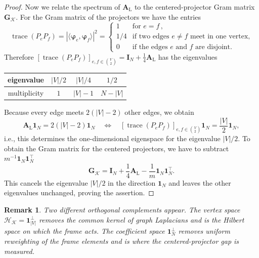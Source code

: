 \documentclass[a4paper]{amsart}
\numberwithin{equation}{section}
\newtheorem{remark}[theorem]{Remark}
\DeclareMathOperator{\trace}{trace}
\begin{document}
\begin{proof}
    Now we relate the spectrum of $\bm A_{\mathrm L}$ to the centered-projector Gram matrix $\bm G_{\mathcal K}$.
    For the Gram matrix of the projectors we have the entries
    \begin{equation*}
        \trace(P_eP_f)
        = |\langle\bm\varphi_e,\bm\varphi_f\rangle|^2
        = \begin{cases} 1 & \text{for }e=f \,, \\ 1/4 & \text{if two edges } e\neq f \text{ meet in one vertex,}\\ 0 & \text{if the edges } e\text{ and } f \text{ are disjoint.}\end{cases}
    \end{equation*}
    Therefore $[\trace(P_eP_f)]_{e,f\in\binom{V}{2}} = \bm I_{N} + \frac 14 \bm A_{\mathrm L}$ has the eigenvalues
    \begin{center}
    \begin{tabular}{c|ccc}
        eigenvalue & $|V|/2$ & $|V|/4$ & $1/2$ \\
        \hline
        multiplicity & $1$ & $|V|-1$ & $N-|V|$
    \end{tabular}
    \end{center}
    Because every edge meets $2(|V|-2)$ other edges, we obtain
    \begin{equation*}
        \bm A_{\mathrm L}\bm 1_{N} = 2(|V|-2)\bm 1_{N}
        \quad\Leftrightarrow\quad
        [\trace(P_eP_f)]_{e,f\in\binom{V}{2}}\bm 1_{N}
        = \frac{|V|}{2}\bm 1_{N} ,
    \end{equation*}
    i.e., this determines the one-dimensional eigenspace for the eigenvalue $|V|/2$.
    To obtain the Gram matrix for the centered projectors, we have to subtract $m^{-1}\bm 1_N\bm 1_N^\top$
    \begin{equation*}
        \bm G_{\mathcal K}
        = \bm I_{N} + \frac 14 \bm A_{\mathrm L} - \frac 1m\bm 1_{N}\bm 1_{N}^\top .
    \end{equation*}
    This cancels the eigenvalue ${|V|}/2$ in the direction $\bm 1_N$ and leaves the other eigenvalues unchanged, proving the assertion.
\end{proof}

\begin{remark}\label{twoperpspaces}
    Two different orthogonal complements appear.
    The vertex space $\mathcal H_{\mathcal K}=\bm 1_{|V|}^\perp$ removes the common kernel of graph Laplacians and is the Hilbert space on which the frame acts.
    The coefficient space $\bm 1_N^\perp$ removes uniform reweighting of the frame elements and is where the centered-projector gap is measured.
\end{remark}
\end{document}
